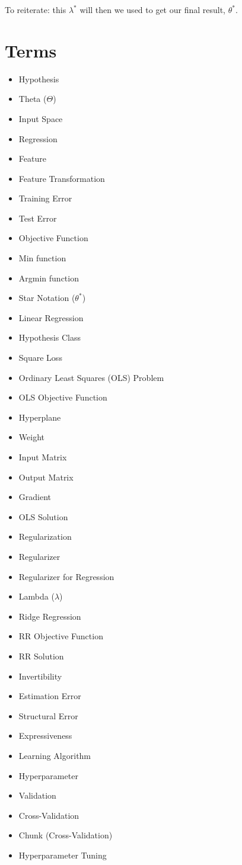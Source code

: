     To reiterate: this $\lambda^*$ will then we used to get our final result, $\theta^*$.
        
\section{Terms}

    \begin{itemize}
        \item Hypothesis
        \item Theta ($\Theta$)
        \item Input Space
        \item Regression
        \item Feature
        \item Feature Transformation
        \item Training Error
        \item Test Error
        \item Objective Function
        \item Min function
        \item Argmin function
        \item Star Notation ($\theta^*$)
        \item Linear Regression
        \item Hypothesis Class
        \item Square Loss
        \item Ordinary Least Squares (OLS) Problem
        \item OLS Objective Function
        \item Hyperplane
        \item Weight
        \item Input Matrix
        \item Output Matrix
        \item Gradient
        \item OLS Solution
        \item Regularization
        \item Regularizer
        \item Regularizer for Regression
        \item Lambda ($\lambda$)
        \item Ridge Regression
        \item RR Objective Function
        \item RR Solution
        \item Invertibility
        \item Estimation Error
        \item Structural Error
        \item Expressiveness
        \item Learning Algorithm
        \item Hyperparameter
        \item Validation
        \item Cross-Validation
        \item Chunk (Cross-Validation)
        \item Hyperparameter Tuning
    \end{itemize}
        
        
        






